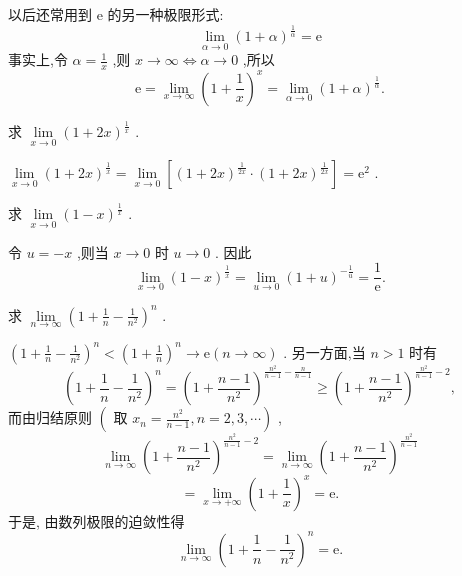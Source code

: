 以后还常用到 \(\mathrm{e}\) 的另一种极限形式:
\[
\mathop{\lim }\limits_{{\alpha  \rightarrow  0}}{\left( 1 + \alpha \right) }^{\frac{1}{\alpha }} = \mathrm{e} \tag{5}
\]
事实上,令 \(\alpha  = \frac{1}{x}\) ,则 \(x \rightarrow  \infty  \Leftrightarrow  \alpha  \rightarrow  0\) ,所以
\[
\mathrm{e} = \mathop{\lim }\limits_{{x \rightarrow  \infty }}{\left( 1 + \frac{1}{x}\right) }^{x} = \mathop{\lim }\limits_{{\alpha  \rightarrow  0}}{\left( 1 + \alpha \right) }^{\frac{1}{\alpha }}.
\]

\begin{example}
求 \(\mathop{\lim }\limits_{{x \rightarrow  0}}{\left( 1 + 2x\right) }^{\frac{1}{x}}\) .
\end{example}


\begin{solution}
\(\mathop{\lim }\limits_{{x \rightarrow  0}}{\left( 1 + 2x\right) }^{\frac{1}{x}} = \mathop{\lim }\limits_{{x \rightarrow  0}}\left\lbrack  {{\left( 1 + 2x\right) }^{\frac{1}{2x}} \cdot  {\left( 1 + 2x\right) }^{\frac{1}{2x}}}\right\rbrack   = {\mathrm{e}}^{2}\) .
\end{solution}


\begin{example}
求 \(\mathop{\lim }\limits_{{x \rightarrow  0}}{\left( 1 - x\right) }^{\frac{1}{x}}\) .
\end{example}


\begin{solution}
令 \(u =  - x\) ,则当 \(x \rightarrow  0\) 时 \(u \rightarrow  0\) . 因此
\[
\mathop{\lim }\limits_{{x \rightarrow  0}}{\left( 1 - x\right) }^{\frac{1}{x}} = \mathop{\lim }\limits_{{u \rightarrow  0}}{\left( 1 + u\right) }^{-\frac{1}{u}} = \frac{1}{\mathrm{e}}.
\]
\end{solution}

\begin{example}
求 \(\mathop{\lim }\limits_{{n \rightarrow  \infty }}{\left( 1 + \frac{1}{n} - \frac{1}{{n}^{2}}\right) }^{n}\) .
\end{example}


\begin{solution}
\({\left( 1 + \frac{1}{n} - \frac{1}{{n}^{2}}\right) }^{n} < {\left( 1 + \frac{1}{n}\right) }^{n} \rightarrow  \mathrm{e}\left( {n \rightarrow  \infty }\right)\) . 另一方面,当 \(n > 1\) 时有
\[
{\left( 1 + \frac{1}{n} - \frac{1}{{n}^{2}}\right) }^{n} = {\left( 1 + \frac{n - 1}{{n}^{2}}\right) }^{\frac{{n}^{2}}{n - 1} - \frac{n}{n - 1}} \geq  {\left( 1 + \frac{n - 1}{{n}^{2}}\right) }^{\frac{{n}^{2}}{n - 1} - 2},
\]
而由归结原则 \(\left( {\text{ 取 }{x}_{n} = \frac{{n}^{2}}{n - 1},n = 2,3,\cdots }\right)\) ,
\[
\mathop{\lim }\limits_{{n \rightarrow  \infty }}{\left( 1 + \frac{n - 1}{{n}^{2}}\right) }^{\frac{{n}^{2}}{n - 1} - 2} = \mathop{\lim }\limits_{{n \rightarrow  \infty }}{\left( 1 + \frac{n - 1}{{n}^{2}}\right) }^{\frac{{n}^{2}}{n - 1}}
\]
\[
= \mathop{\lim }\limits_{{x \rightarrow   + \infty }}{\left( 1 + \frac{1}{x}\right) }^{x} = \mathrm{e}.
\]
于是, 由数列极限的迫敛性得
\[
\mathop{\lim }\limits_{{n \rightarrow  \infty }}{\left( 1 + \frac{1}{n} - \frac{1}{{n}^{2}}\right) }^{n} = \mathrm{e}.
\]
\end{solution}

